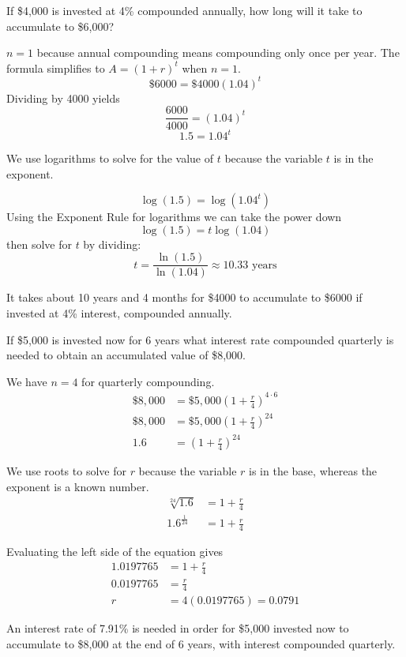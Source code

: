 \begin{example}
    If \$4,000 is invested at 4\% compounded annually, how long will it take to accumulate to \$6,000?
\end{example}
\begin{solution}
    \( n = 1 \) because annual compounding means compounding only once per year.
    The formula simplifies to \( A = (1+r)^t \) when \( n = 1 \).
    \[ \$6000 = \$4000(1.04)^t \]
    Dividing by 4000 yields
    \[ \frac{6000}{4000} = (1.04)^t \]
    \[ 1.5 = 1.04^t \]

    We use logarithms to solve for the value of \( t \) because the variable \( t \) is in the exponent.

    \[ \log(1.5) = \log(1.04^t) \]
    Using the Exponent Rule for logarithms we can take the power down
    \[ \log(1.5) = t\log(1.04) \]
    then solve for \( t \) by dividing:
    \[ t = \frac{\ln(1.5)}{\ln(1.04)} \approx 10.33 \text{ years} \]

    It takes about 10 years and 4 months for \$4000 to accumulate to \$6000 if invested at 4\% interest, compounded annually.
\end{solution}

\begin{example}
    If \$5,000 is invested now for 6 years what interest rate compounded quarterly is needed to obtain an accumulated value of \$8,000.
\end{example}
\begin{solution}
    We have \( n = 4 \) for quarterly compounding.
    \begin{align*}
        \$8,000 & = \$5,000 \left(1 + \frac{r}{4}\right)^{4 \cdot 6} \\
        \$8,000 & = \$5,000 \left(1 + \frac{r}{4}\right)^{24}        \\
        1.6     & = \left(1 + \frac{r}{4}\right)^{24}
    \end{align*}

    We use roots to solve for \( r \) because the variable \( r \) is in the base, whereas the exponent is a known number.
    \begin{align*}
        \sqrt[24]{1.6}     & = 1 + \frac{r}{4} \\
        1.6^{\frac{1}{24}} & = 1 + \frac{r}{4}
    \end{align*}

    Evaluating the left side of the equation gives
    \begin{align*}
        1.0197765 & = 1 + \frac{r}{4}       \\
        0.0197765 & = \frac{r}{4}           \\
        r         & = 4(0.0197765) = 0.0791
    \end{align*}

    An interest rate of 7.91\% is needed in order for \$5,000 invested now to accumulate to \$8,000 at the end of 6 years, with interest compounded quarterly.
\end{solution}

